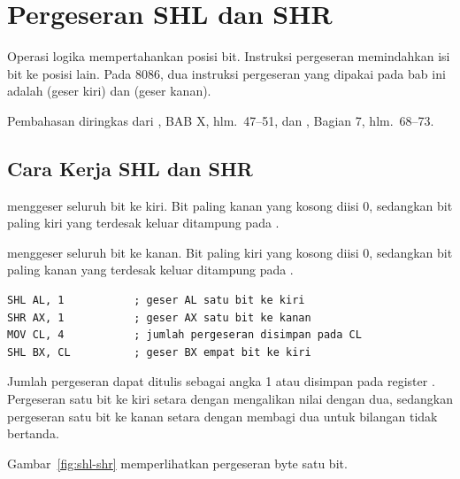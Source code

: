 \section{Pergeseran SHL dan SHR}
\label{sec:shl-shr}

Operasi logika mempertahankan posisi bit. Instruksi pergeseran
memindahkan isi bit ke posisi lain. Pada 8086, dua instruksi
pergeseran yang dipakai pada bab ini adalah  (geser kiri)
dan  (geser kanan).

Pembahasan diringkas dari \cite{sto2001}, BAB X, hlm.~47--51, dan
\cite{gunawan2019}, Bagian 7, hlm.~68--73.

\subsection{Cara Kerja SHL dan SHR}

 menggeser seluruh bit ke kiri. Bit paling kanan yang kosong
diisi 0, sedangkan bit paling kiri yang terdesak keluar ditampung
pada .

 menggeser seluruh bit ke kanan. Bit paling kiri yang
kosong diisi 0, sedangkan bit paling kanan yang terdesak keluar
ditampung pada .

\begin{lstlisting}[language=MASM, numbers=none]
SHL AL, 1           ; geser AL satu bit ke kiri
SHR AX, 1           ; geser AX satu bit ke kanan
MOV CL, 4           ; jumlah pergeseran disimpan pada CL
SHL BX, CL          ; geser BX empat bit ke kiri
\end{lstlisting}

Jumlah pergeseran dapat ditulis sebagai angka 1 atau disimpan pada
register . Pergeseran satu bit ke kiri setara dengan
mengalikan nilai dengan dua, sedangkan pergeseran satu bit ke kanan
setara dengan membagi dua untuk bilangan tidak bertanda.

Gambar~\ref{fig:shl-shr} memperlihatkan pergeseran byte 
satu bit.

